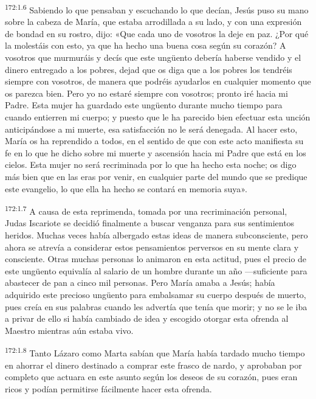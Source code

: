 \par 
\textsuperscript{172:1.6} Sabiendo lo que pensaban y escuchando lo que decían, Jesús puso su mano sobre la cabeza de María, que estaba arrodillada a su lado, y con una expresión de bondad en su rostro, dijo: «Que cada uno de vosotros la deje en paz. ¿Por qué la molestáis con esto, ya que ha hecho una buena cosa según su corazón? A vosotros que murmuráis y decís que este ung\"uento debería haberse vendido y el dinero entregado a los pobres, dejad que os diga que a los pobres los tendréis siempre con vosotros, de manera que podréis ayudarlos en cualquier momento que os parezca bien. Pero yo no estaré siempre con vosotros; pronto iré hacia mi Padre. Esta mujer ha guardado este ung\"uento durante mucho tiempo para cuando entierren mi cuerpo; y puesto que le ha parecido bien efectuar esta unción anticipándose a mi muerte, esa satisfacción no le será denegada. Al hacer esto, María os ha reprendido a todos, en el sentido de que con este acto manifiesta su fe en lo que he dicho sobre mi muerte y ascensión hacia mi Padre que está en los cielos. Esta mujer no será recriminada por lo que ha hecho esta noche; os digo más bien que en las eras por venir, en cualquier parte del mundo que se predique este evangelio, lo que ella ha hecho se contará en memoria suya».

\par 
\textsuperscript{172:1.7} A causa de esta reprimenda, tomada por una recriminación personal, Judas Iscariote se decidió finalmente a buscar venganza para sus sentimientos heridos. Muchas veces había albergado estas ideas de manera subconsciente, pero ahora se atrevía a considerar estos pensamientos perversos en su mente clara y consciente. Otras muchas personas lo animaron en esta actitud, pues el precio de este ung\"uento equivalía al salario de un hombre durante un año ---suficiente para abastecer de pan a cinco mil personas. Pero María amaba a Jesús; había adquirido este precioso ung\"uento para embalsamar su cuerpo después de muerto, pues creía en sus palabras cuando les advertía que tenía que morir; y no se le iba a privar de ello si había cambiado de idea y escogido otorgar esta ofrenda al Maestro mientras aún estaba vivo.

\par 
\textsuperscript{172:1.8} Tanto Lázaro como Marta sabían que María había tardado mucho tiempo en ahorrar el dinero destinado a comprar este frasco de nardo, y aprobaban por completo que actuara en este asunto según los deseos de su corazón, pues eran ricos y podían permitirse fácilmente hacer esta ofrenda.

